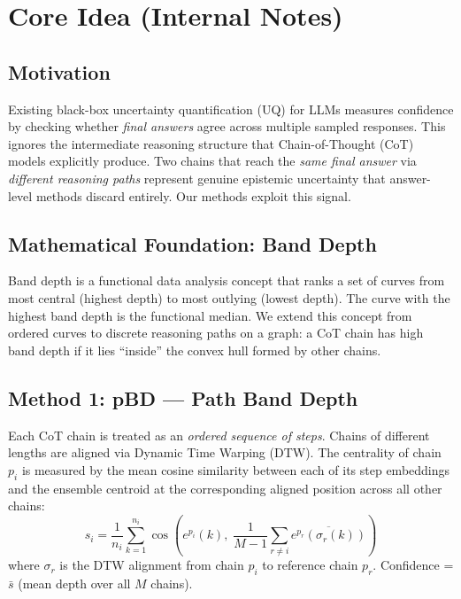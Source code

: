 
\section*{Core Idea (Internal Notes)}

\subsection*{Motivation}

Existing black-box uncertainty quantification (UQ) for LLMs measures confidence by
checking whether \emph{final answers} agree across multiple sampled responses.
This ignores the intermediate reasoning structure that Chain-of-Thought (CoT) models
explicitly produce. Two chains that reach the \emph{same final answer} via
\emph{different reasoning paths} represent genuine epistemic uncertainty that
answer-level methods discard entirely. Our methods exploit this signal.

\subsection*{Mathematical Foundation: Band Depth}

Band depth is a functional data analysis concept that ranks a set of curves from most
central (highest depth) to most outlying (lowest depth). The curve with the highest
band depth is the functional median. We extend this concept from ordered curves to
discrete reasoning paths on a graph: a CoT chain has high band depth if it lies
``inside'' the convex hull formed by other chains.

\subsection*{Method 1: pBD --- Path Band Depth}

Each CoT chain is treated as an \emph{ordered sequence of steps}. Chains of
different lengths are aligned via Dynamic Time Warping (DTW). The centrality of
chain $p_i$ is measured by the mean cosine similarity between each of its
step embeddings and the ensemble centroid at the corresponding aligned position
across all other chains:
\[
s_i = \frac{1}{n_i} \sum_{k=1}^{n_i}
\cos\!\left(e^{p_i}(k),\; \frac{1}{M-1}\sum_{r \neq i}
\overline{e^{p_r}(\sigma_r(k))}\right)
\]
where $\sigma_r$ is the DTW alignment from chain $p_i$ to reference chain $p_r$.
Confidence = $\bar{s}$ (mean depth over all $M$ chains).

